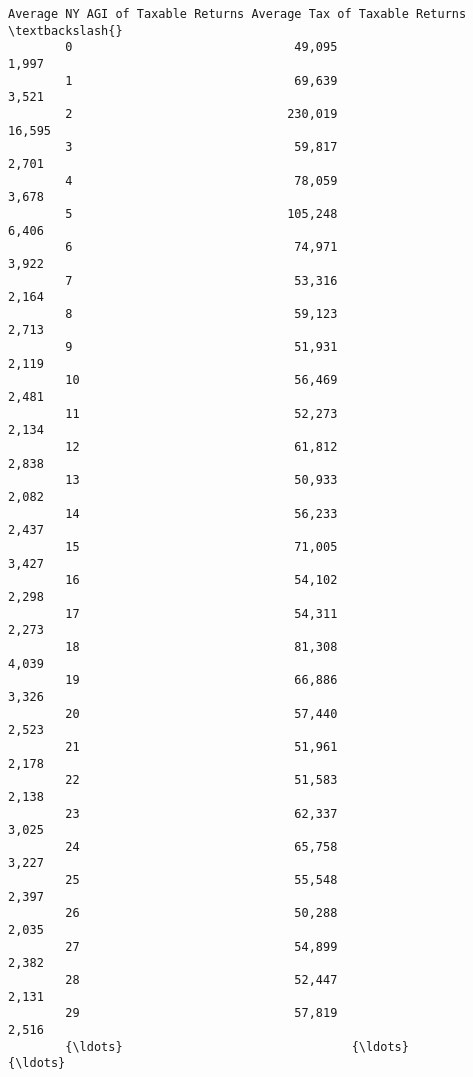 \documentclass[11pt]{article}
\begin{document}
\begin{Verbatim}[commandchars=\\\{\}]
             Average NY AGI of Taxable Returns Average Tax of Taxable Returns  \textbackslash{}
        0                               49,095                          1,997   
        1                               69,639                          3,521   
        2                              230,019                         16,595   
        3                               59,817                          2,701   
        4                               78,059                          3,678   
        5                              105,248                          6,406   
        6                               74,971                          3,922   
        7                               53,316                          2,164   
        8                               59,123                          2,713   
        9                               51,931                          2,119   
        10                              56,469                          2,481   
        11                              52,273                          2,134   
        12                              61,812                          2,838   
        13                              50,933                          2,082   
        14                              56,233                          2,437   
        15                              71,005                          3,427   
        16                              54,102                          2,298   
        17                              54,311                          2,273   
        18                              81,308                          4,039   
        19                              66,886                          3,326   
        20                              57,440                          2,523   
        21                              51,961                          2,178   
        22                              51,583                          2,138   
        23                              62,337                          3,025   
        24                              65,758                          3,227   
        25                              55,548                          2,397   
        26                              50,288                          2,035   
        27                              54,899                          2,382   
        28                              52,447                          2,131   
        29                              57,819                          2,516   
        {\ldots}                                {\ldots}                            {\ldots}   

\end{Verbatim}
\end{document}
